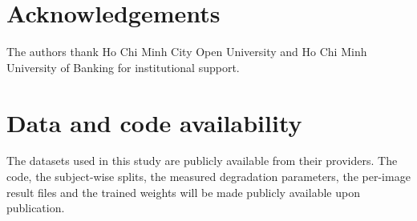 \documentclass[preprint,12pt]{elsarticle}
\begin{document}
\section*{Acknowledgements}
The authors thank Ho Chi Minh City Open University and Ho Chi Minh University of Banking for institutional support.

\section*{Data and code availability}
The datasets used in this study are publicly available from their providers. The code, the subject-wise splits, the measured degradation parameters, the per-image result files and the trained weights will be made publicly available upon publication.





\end{document}
